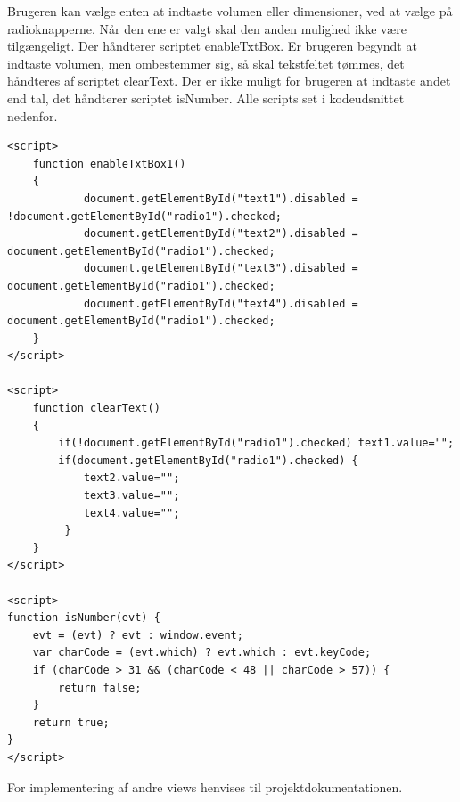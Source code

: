 Brugeren kan vælge enten at indtaste volumen eller dimensioner, ved at vælge på radioknapperne. Når den ene er valgt skal den anden mulighed ikke være tilgængeligt. Der håndterer scriptet enableTxtBox. Er brugeren begyndt at indtaste volumen, men ombestemmer sig, så skal tekstfeltet tømmes, det håndteres af scriptet clearText. Der er ikke muligt for brugeren at indtaste andet end tal, det håndterer scriptet isNumber. Alle scripts set i kodeudsnittet nedenfor.

\begin{lstlisting}[caption=AddPoolScripts, label=code:scripts]
 <script>
	function enableTxtBox1()
	{
         	document.getElementById("text1").disabled = !document.getElementById("radio1").checked;
         	document.getElementById("text2").disabled = document.getElementById("radio1").checked;
         	document.getElementById("text3").disabled = document.getElementById("radio1").checked;
         	document.getElementById("text4").disabled = document.getElementById("radio1").checked;
    }
</script>

<script>
	function clearText()
	{
		if(!document.getElementById("radio1").checked) text1.value="";
		if(document.getElementById("radio1").checked) {
         	text2.value="";
         	text3.value="";
         	text4.value="";
         }
    }
</script>

<script>
function isNumber(evt) {
    evt = (evt) ? evt : window.event;
    var charCode = (evt.which) ? evt.which : evt.keyCode;
    if (charCode > 31 && (charCode < 48 || charCode > 57)) {
        return false;
    }
    return true;
}
</script>
\end{lstlisting} 

For implementering af andre views henvises til projektdokumentationen. 


